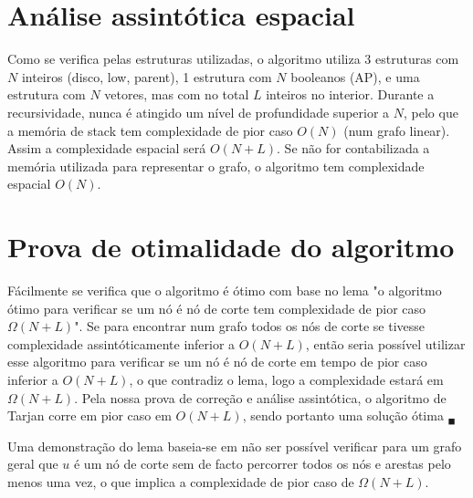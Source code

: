 \documentclass{scrartcl}
\begin{document}
\section*{Análise assintótica espacial}
Como se verifica pelas estruturas utilizadas, o algoritmo utiliza 3 estruturas com $N$ inteiros (disco, low, parent), 1 estrutura com $N$ booleanos (AP), e uma estrutura com $N$ vetores, mas com no total $L$ inteiros no interior. Durante a recursividade, nunca é atingido um nível de profundidade superior a $N$, pelo que a memória de stack tem complexidade de pior caso $O(N)$ (num grafo linear). Assim a complexidade espacial será $O(N+L)$. Se não for contabilizada a memória utilizada para representar o grafo, o algoritmo tem complexidade espacial $O(N)$.

\section*{Prova de otimalidade do algoritmo}
Fácilmente se verifica que o algoritmo é ótimo com base no lema "o algoritmo ótimo para verificar se um nó é nó de corte tem complexidade de pior caso $\Omega(N+L)$".
Se para encontrar num grafo todos os nós de corte se tivesse complexidade assintóticamente inferior a $O(N+L)$, então seria possível utilizar esse algoritmo para verificar se um nó é nó de corte em tempo de pior caso inferior a $O(N+L)$, o que contradiz o lema, logo a complexidade estará em $\Omega (N+L)$. Pela nossa prova de correção e análise assintótica, o algoritmo de Tarjan corre em pior caso em $O(N+L)$, sendo portanto uma solução ótima $_\blacksquare$

Uma demonstração do lema baseia-se em não ser possível verificar para um grafo geral que $u$ é um nó de corte sem de facto percorrer todos os nós e arestas pelo menos uma vez, o que implica a complexidade de pior caso de  $\Omega (N+L)$.


\end{document}
